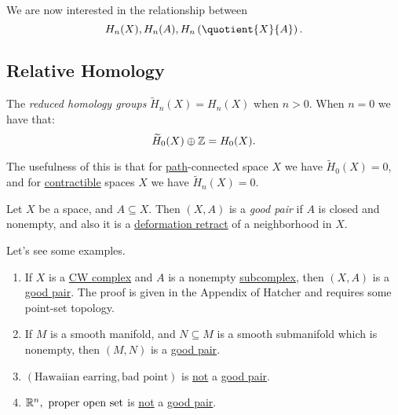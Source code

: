 We are now interested in the relationship between
\[
	H_{n}(X), H_{n} (A), H_{n} \left(\quotient{X}{A}\right).
\]

\subsection{Relative Homology}
\begin{definition}\label{def:reduced-homology-group}
	The \emph{reduced homology groups} \(\widetilde{H}_n(X) = H_n(X)\) when \(n > 0\). When \(n = 0\) we have that:
	\[
		\widetilde{H}_0(X) \oplus \mathbb{\MakeUppercase{z}} = H_0(X).
	\]
\end{definition}
\begin{remark}
	The usefulness of this is that for \hyperref[def:path]{path}-connected space \(X\) we have \(\widetilde{H}_0(X) = 0\), and for
	\hyperref[def:contractible]{contractible} spaces $X$ we have $\widetilde{H}_n(X) = 0$.
\end{remark}

\begin{definition}\label{def:good-pair}
	Let $X$ be a space, and $A \subseteq X$. Then $(X, A)$ is a \emph{good pair} if $A$ is closed and nonempty, and also it is a
	\hyperref[def:deformation-retraction]{deformation retract} of a neighborhood in $X$.
\end{definition}

\begin{eg}
	Let's see some examples.
	\begin{enumerate}
		\item If $X$ is a \hyperref[def:CW-Complex]{CW complex} and $A$ is a nonempty \hyperref[def:CW-subcomplex]{subcomplex}, then $(X, A)$ is a \hyperref[def:good-pair]{good pair}.
		      The proof is given in the Appendix of Hatcher\cite{hatcher2002algebraic} and requires some point-set topology.
		\item If \(M\) is a smooth manifold, and \(N\subseteq M\) is a smooth submanifold which is nonempty, then \((M, N)\) is a \hyperref[def:good-pair]{good pair}.
		\item \((\text{Hawaiian earring}, \text{bad point})\) is \underline{not} a \hyperref[def:good-pair]{good pair}.
		\item \(\mathbb{\MakeUppercase{r}} ^n, \text{ proper open set} \) is \underline{not} a \hyperref[def:good-pair]{good pair}.
	\end{enumerate}
\end{eg}

